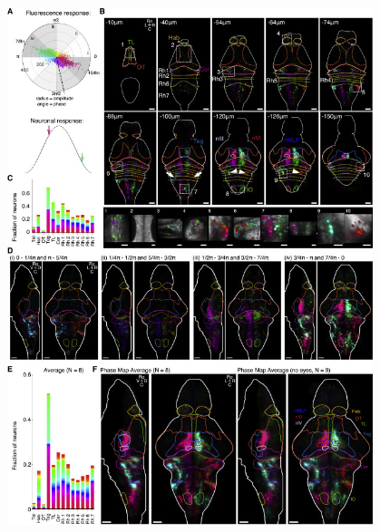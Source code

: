 \begin{figure}
    \centering
    \includegraphics[width=0.95\textwidth]{./files/Migault_et-al_Fig4.jpg}
    \caption{\label{FIGMigault4}} 
    \end{figure}

